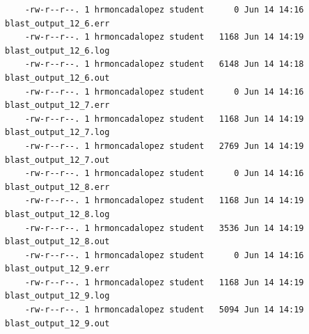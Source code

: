 \documentclass{article}
\begin{document}
\begin{itemize}
\begin{verbatim}
    -rw-r--r--. 1 hrmoncadalopez student      0 Jun 14 14:16 blast_output_12_6.err
    -rw-r--r--. 1 hrmoncadalopez student   1168 Jun 14 14:19 blast_output_12_6.log
    -rw-r--r--. 1 hrmoncadalopez student   6148 Jun 14 14:18 blast_output_12_6.out
    -rw-r--r--. 1 hrmoncadalopez student      0 Jun 14 14:16 blast_output_12_7.err
    -rw-r--r--. 1 hrmoncadalopez student   1168 Jun 14 14:19 blast_output_12_7.log
    -rw-r--r--. 1 hrmoncadalopez student   2769 Jun 14 14:19 blast_output_12_7.out
    -rw-r--r--. 1 hrmoncadalopez student      0 Jun 14 14:16 blast_output_12_8.err
    -rw-r--r--. 1 hrmoncadalopez student   1168 Jun 14 14:19 blast_output_12_8.log
    -rw-r--r--. 1 hrmoncadalopez student   3536 Jun 14 14:19 blast_output_12_8.out
    -rw-r--r--. 1 hrmoncadalopez student      0 Jun 14 14:16 blast_output_12_9.err
    -rw-r--r--. 1 hrmoncadalopez student   1168 Jun 14 14:19 blast_output_12_9.log
    -rw-r--r--. 1 hrmoncadalopez student   5094 Jun 14 14:19 blast_output_12_9.out
\end{verbatim}
\normalsize
\end{itemize}
\end{document}
